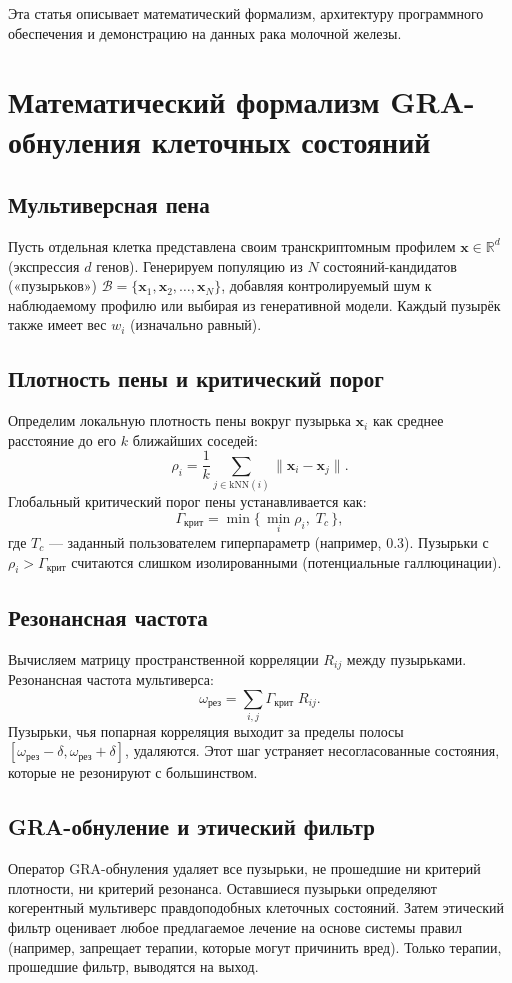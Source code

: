 \documentclass[12pt,a4paper]{article}
\begin{document}
Эта статья описывает математический формализм, архитектуру программного обеспечения и демонстрацию на данных рака молочной железы.

\section{Математический формализм GRA-обнуления клеточных состояний}

\subsection{Мультиверсная пена}
Пусть отдельная клетка представлена своим транскриптомным профилем $\mathbf{x} \in \mathbb{R}^d$ (экспрессия $d$ генов). Генерируем популяцию из $N$ состояний-кандидатов («пузырьков») $\mathcal{B} = \{\mathbf{x}_1, \mathbf{x}_2, \dots, \mathbf{x}_N\}$, добавляя контролируемый шум к наблюдаемому профилю или выбирая из генеративной модели. Каждый пузырёк также имеет вес $w_i$ (изначально равный).

\subsection{Плотность пены и критический порог}
Определим локальную плотность пены вокруг пузырька $\mathbf{x}_i$ как среднее расстояние до его $k$ ближайших соседей:
\[
\rho_i = \frac{1}{k} \sum_{j \in \text{kNN}(i)} \|\mathbf{x}_i - \mathbf{x}_j\|.
\]
Глобальный критический порог пены устанавливается как:
\[
\Gamma_{\text{крит}} = \min\{\, \min_i \rho_i ,\; T_c \,\},
\]
где $T_c$ — заданный пользователем гиперпараметр (например, 0.3). Пузырьки с $\rho_i > \Gamma_{\text{крит}}$ считаются слишком изолированными (потенциальные галлюцинации).

\subsection{Резонансная частота}
Вычисляем матрицу пространственной корреляции $R_{ij}$ между пузырьками. Резонансная частота мультиверса:
\[
\omega_{\text{рез}} = \sum_{i,j} \Gamma_{\text{крит}} \; R_{ij}.
\]
Пузырьки, чья попарная корреляция выходит за пределы полосы $[\omega_{\text{рез}}-\delta, \omega_{\text{рез}}+\delta]$, удаляются. Этот шаг устраняет несогласованные состояния, которые не резонируют с большинством.

\subsection{GRA-обнуление и этический фильтр}
Оператор GRA-обнуления удаляет все пузырьки, не прошедшие ни критерий плотности, ни критерий резонанса. Оставшиеся пузырьки определяют когерентный мультиверс правдоподобных клеточных состояний. Затем этический фильтр оценивает любое предлагаемое лечение на основе системы правил (например, запрещает терапии, которые могут причинить вред). Только терапии, прошедшие фильтр, выводятся на выход.
\end{document}
